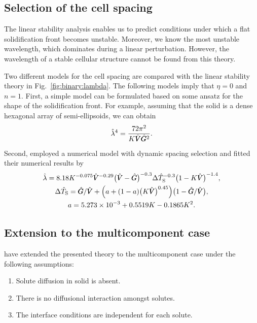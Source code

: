 \documentclass{article}
\newcommand{\sol}{\text{S}}
\newcommand{\hV}[1][\qty(\bar{V})]{\vphantom{#1}\mathrlap{\smash{\hat{V}}}V}
\newcommand{\hG}[1][\qty(\bar{G})]{\vphantom{#1}\mathrlap{\smash{\hat{G}}}G}
\begin{document}
\subsection{Selection of the cell spacing}

The linear stability analysis enables us to predict conditions
under which a flat solidification front becomes unstable.
Moreover, we know the most unstable wavelength, which dominates during a linear perturbation.
However, the wavelength of a stable cellular structure cannot be found from this theory.

Two different models for the cell spacing are compared with the linear stability theory
in Fig.~\ref{fig:binary:lambda}.
The following models imply that $\eta=0$ and $n=1$.
First, a simple model can be formulated based on some ansatz for the shape of the solidification front.
For example, assuming that the solid is a dense hexagonal array of semi-ellipsoids,
we can obtain~\cite{rappaz2009solidification}
\begin{equation}\label{eq:cell_spacing}
    \hat\lambda^4 = \frac{72\pi^2}{K\hV\hG^2}.
\end{equation}
Second, \textcite{hunt1996numerical} employed a numerical model with dynamic spacing selection
and fitted their numerical results by
\begin{equation}\label{eq:Hunt96}
    \begin{gathered}
        \hat\lambda = 8.18 K^{-0.075}\hV^{-0.29}\qty(\hV - \hG)^{-0.3}\Delta\hat{T}_\sol^{-0.3}\qty(1-K\hV)^{-1.4}, \\
        \Delta\hat{T}_\sol = \hG/\hV + \qty(a + (1-a)\qty(K\hV)^{0.45})\qty(1-\hG/\hV), \\
        a = \num{5.273e-3} + 0.5519K - 0.1865K^2.
    \end{gathered}
\end{equation}

\subsection{Extension to the multicomponent case}

\textcite{coriell1987stability} have extended the presented theory to the multicomponent case
under the following assumptions:
\begin{enumerate}
    \item Solute diffusion in solid is absent.
    \item There is no diffusional interaction amongst solutes.
    \item The interface conditions are independent for each solute.
\end{enumerate}
\end{document}
